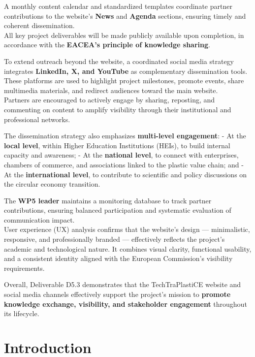 \documentclass[
  12pt,
  oneside]{book}
\begin{document}
A monthly content calendar and standardized templates coordinate partner
contributions to the website's \textbf{News} and \textbf{Agenda}
sections, ensuring timely and coherent dissemination.\\
All key project deliverables will be made publicly available upon
completion, in accordance with the \textbf{EACEA's principle of
knowledge sharing}.

To extend outreach beyond the website, a coordinated social media
strategy integrates \textbf{LinkedIn, X, and YouTube} as complementary
dissemination tools. These platforms are used to highlight project
milestones, promote events, share multimedia materials, and redirect
audiences toward the main website.\\
Partners are encouraged to actively engage by sharing, reposting, and
commenting on content to amplify visibility through their institutional
and professional networks.

The dissemination strategy also emphasizes \textbf{multi-level
engagement}: - At the \textbf{local level}, within Higher Education
Institutions (HEIs), to build internal capacity and awareness; - At the
\textbf{national level}, to connect with enterprises, chambers of
commerce, and associations linked to the plastic value chain; and - At
the \textbf{international level}, to contribute to scientific and policy
discussions on the circular economy transition.

The \textbf{WP5 leader} maintains a monitoring database to track partner
contributions, ensuring balanced participation and systematic evaluation
of communication impact.\\
User experience (UX) analysis confirms that the website's design ---
minimalistic, responsive, and professionally branded --- effectively
reflects the project's academic and technological nature. It combines
visual clarity, functional usability, and a consistent identity aligned
with the European Commission's visibility requirements.

Overall, Deliverable D5.3 demonstrates that the TechTraPlastiCE website
and social media channels effectively support the project's mission to
\textbf{promote knowledge exchange, visibility, and stakeholder
engagement} throughout its lifecycle.

\chapter{Introduction}\label{introduction}
\end{document}
